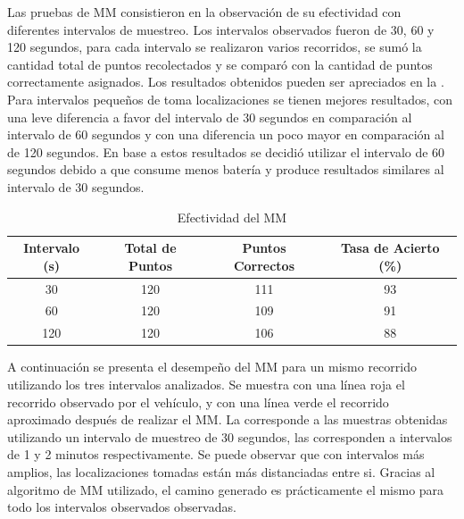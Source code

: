 Las pruebas de MM consistieron en la observación de su efectividad con diferentes intervalos de muestreo. Los intervalos observados fueron de 30, 60 y 120 segundos, para cada intervalo se realizaron varios recorridos, se sumó la cantidad total de puntos recolectados y se comparó con la cantidad de puntos correctamente asignados. Los resultados obtenidos pueden ser apreciados en la . Para intervalos pequeños de toma localizaciones se tienen mejores resultados, con una leve diferencia a favor del intervalo de 30 segundos en comparación al intervalo de 60 segundos y con una diferencia un poco mayor en comparación al de 120 segundos. En base a estos resultados se decidió utilizar el intervalo de 60 segundos debido a que consume menos batería y produce resultados similares al intervalo de 30 segundos.

\begin{table}[h]
	\centering
	\begin{tabular}{cccc}
        \toprule
    	Intervalo (s) & Total de Puntos & Puntos Correctos & Tasa de Acierto (\%)\\
    	\midrule
    	30 & 120  & 111 & 93 \\
    	60 & 120 & 109 & 91 \\
    	120 & 120 & 106 & 88 \\ 
    	\bottomrule
	\end{tabular}
	\caption{Efectividad del MM} 
	\label{table:map_matching}
\end{table}

A continuación se presenta el desempeño del MM para un mismo recorrido utilizando los tres intervalos analizados. Se muestra con una línea roja el recorrido observado por el vehículo, y con una línea verde el recorrido aproximado después de realizar el MM. La  corresponde a las muestras obtenidas utilizando un intervalo de muestreo de 30 segundos, las  corresponden a intervalos de 1 y 2 minutos respectivamente. Se puede observar que con intervalos más amplios, las localizaciones tomadas están más distanciadas entre si. Gracias al algoritmo de MM utilizado, el camino generado es prácticamente el mismo para todo los intervalos observados observadas.

